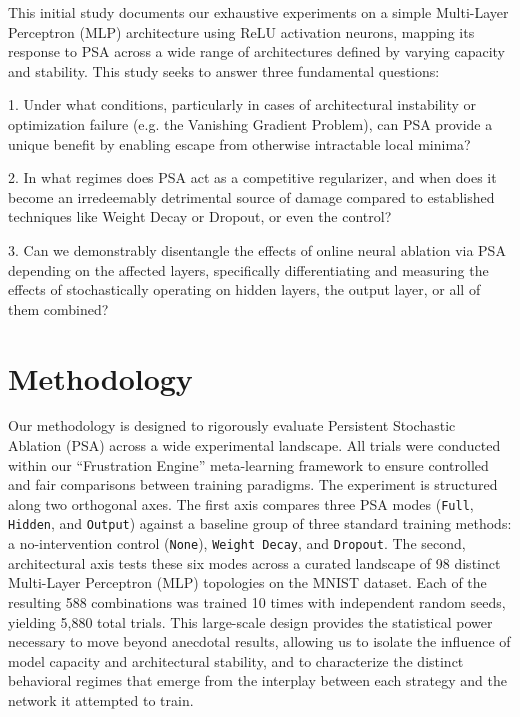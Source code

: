 \documentclass[conference]{IEEEtran}
\begin{document}
This initial study documents our exhaustive experiments on a simple Multi-Layer Perceptron (MLP) architecture using ReLU activation neurons, mapping its response to PSA across a wide range of architectures defined by varying capacity and stability. This study seeks to answer three fundamental questions:

1. Under what conditions, particularly in cases of architectural instability or optimization failure (e.g. the Vanishing Gradient Problem\cite{b5}), can PSA provide a unique benefit by enabling escape from otherwise intractable local minima?

2. In what regimes does PSA act as a competitive regularizer, and when does it become an irredeemably detrimental source of damage compared to established techniques like Weight Decay or Dropout, or even the control?

3. Can we demonstrably disentangle the effects of online neural ablation via PSA depending on the affected layers, specifically differentiating and measuring the effects of stochastically operating on hidden layers, the output layer, or all of them combined?

\section{Methodology}

Our methodology is designed to rigorously evaluate Persistent Stochastic Ablation (PSA) across a wide experimental landscape. All trials were conducted within our ``Frustration Engine'' meta-learning framework to ensure controlled and fair comparisons between training paradigms. The experiment is structured along two orthogonal axes. The first axis compares three PSA modes (\verb|Full|, \verb|Hidden|, and \verb|Output|) against a baseline group of three standard training methods: a no-intervention control (\verb|None|), \verb|Weight Decay|, and \verb|Dropout|. The second, architectural axis tests these six modes across a curated landscape of 98 distinct Multi-Layer Perceptron (MLP) topologies on the MNIST dataset. Each of the resulting 588 combinations was trained 10 times with independent random seeds, yielding 5,880 total trials. This large-scale design provides the statistical power necessary to move beyond anecdotal results, allowing us to isolate the influence of model capacity and architectural stability, and to characterize the distinct behavioral regimes that emerge from the interplay between each strategy and the network it attempted to train.
\end{document}
